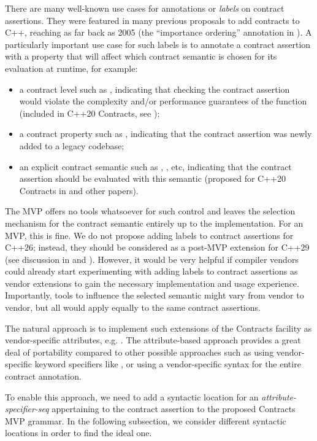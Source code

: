 There are many well-known use cases for annotations or \emph{labels} on contract assertions. They were featured in many previous proposals to add contracts to C++, reaching as far back as 2005 (the ``importance ordering'' annotation in \cite{N1866}). A particularly important use case for such labels is to annotate a contract assertion with a property that will affect which contract semantic is chosen for its evaluation at runtime, for example:
\begin{itemize}
\item a contract level such as , indicating that checking the contract assertion would violate the complexity and/or performance guarantees of the function (included in C++20 Contracts, see \cite{P0542R5});
\item a contract property such as , indicating that the contract assertion was newly added to a legacy codebase;
\item an explicit contract semantic such as , , etc, indicating that the contract assertion should be evaluated with this semantic (proposed for C++20 Contracts in \cite{P1429R3} and other papers).
\end{itemize}
The MVP offers no tools whatsoever for such control and leaves the selection mechanism for the contract semantic entirely up to the implementation. For an MVP, this is fine. We do not propose adding labels to contract assertions for C++26; instead, they should be considered as a post-MVP extension for C++29 (see discussion in \cite{P2755R0} and \cite{P2885R3}). However, it would be very helpful if compiler vendors could already start experimenting with adding labels to contract assertions as vendor extensions to gain the necessary implementation and usage experience. Importantly, tools to influence the selected semantic might vary from vendor to vendor, but all would apply equally to the same contract assertions.

The natural approach is to implement such extensions of the Contracts facility as vendor-specific attributes, e.g. . The attribute-based approach provides a great deal of portability compared to other possible approaches such as using vendor-specific keyword specifiers like , or using a vendor-specific syntax for the entire contract annotation.

To enable this approach, we need to add a syntactic location for an \emph{attribute-specifier-seq} appertaining to the contract assertion to the proposed Contracts MVP grammar. In the following subsection, we consider different syntactic locations in order to find the ideal one.

